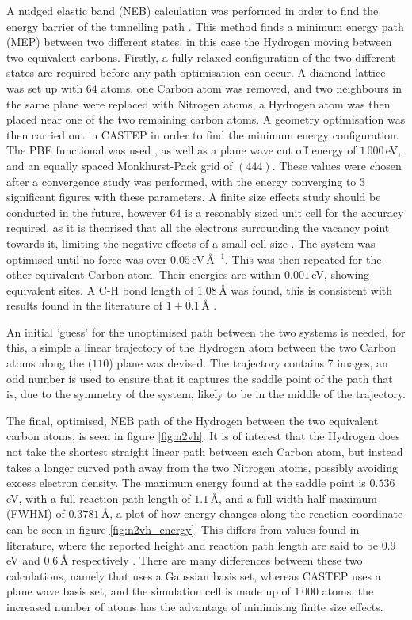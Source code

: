 \documentclass[10pt,a4paper,twocolumn,twoside]{extarticle}
\begin{document}
A nudged elastic band (NEB) calculation was performed in order to find the energy barrier of the tunnelling path \cite{NEB}.
This method finds a minimum energy path (MEP) between two different states, in this case the Hydrogen moving between two equivalent carbons.
Firstly, a fully relaxed configuration of the two different states are required before any path optimisation can occur.
A diamond lattice was set up with $64$ atoms, one Carbon atom was removed, and two neighbours in the same plane were replaced with Nitrogen atoms, a Hydrogen atom was then placed near one of the two remaining carbon atoms. A geometry optimisation was then carried out in CASTEP in order to find the minimum energy configuration. The PBE functional was used \cite{PBE}, as well as a plane wave cut off energy of $1\,000$\,eV, and an equally spaced Monkhurst-Pack grid of $(4 4 4)$. These values were chosen after a convergence study was performed, with the energy converging to 3 significant figures with these parameters. A finite size effects study should be conducted in the future, however $64$ is a resonably sized unit cell for the accuracy required, as it is theorised that all the electrons surrounding the vacancy point towards it, limiting the negative effects of a small cell size \cite{NVCage}. The system was optimised until no force was over $0.05$\,eV\,\AA$^{-1}$. This was then repeated for the other equivalent Carbon atom. Their energies are within $0.001$\,eV, showing equivalent sites. A C-H bond length of $1.08$\,{\AA} was found, this is consistent with results found in the literature of $1 \pm 0.1$\,{\AA} \cite{N2VH_CH_Bond}.

An initial 'guess' for the unoptimised path between the two systems is needed, for this, a simple a linear trajectory of the Hydrogen atom between the two Carbon atoms along the ($110$) plane was devised. The trajectory contains 7 images, an odd number is used to ensure that it captures the saddle point of the path that is, due to the symmetry of the system, likely to be in the middle of the trajectory. 

The final, optimised, NEB path of the Hydrogen between the two equivalent carbon atoms, is seen in figure \ref{fig:n2vh}. It is of interest that the Hydrogen does not take the shortest straight linear path between each Carbon atom, but instead takes a longer curved path away from the two Nitrogen atoms, possibly avoiding excess electron density. The maximum energy found at the saddle point is $0.536$\,eV, with a full reaction path length of $1.1$\,{\AA}, and a full width half maximum (FWHM) of $0.3781$\,{\AA}, a plot of how energy changes along the reaction coordinate can be seen in figure \ref{fig:n2vh_energy}. This differs from values found in literature, where the reported height and reaction path length are said to be $0.9$\,eV and $0.6$\,{\AA} respectively \cite{Peaker}. There are many differences between these two calculations, namely that \textcite{Peaker} uses a Gaussian basis set, whereas CASTEP uses a plane wave basis set, and the simulation cell is made up of $1\,000$ atoms, the increased number of atoms has the advantage of minimising finite size effects. 
\end{document}
